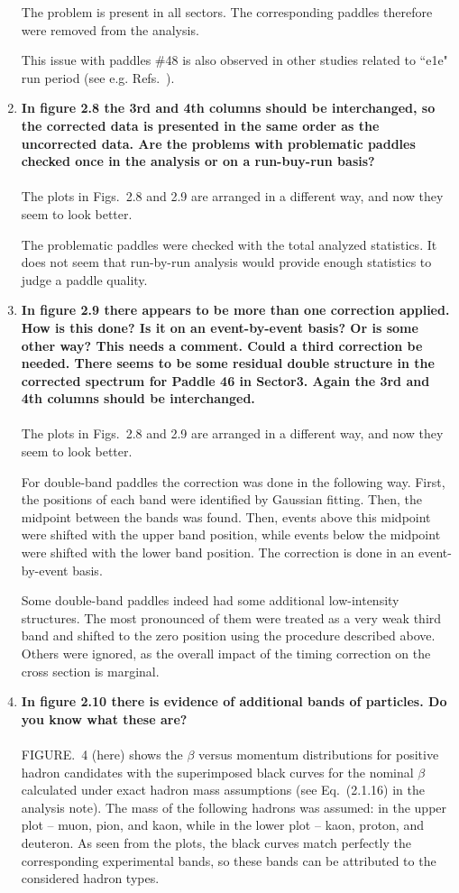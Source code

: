 \documentclass[,superscriptaddress,showpacs,amssymb,amsmath,amsfonts,linenumbers,article]{revtex4-1}
\begin{document}
\begin{enumerate}[label=\textbf{\arabic*}.]
The problem is present in all sectors. The corresponding paddles therefore were removed from the analysis.

This issue with paddles \#48 is also observed in other studies related to ``e1e" run period (see e.g. Refs.~\cite{fedotov_prc,Ye_Tian:2017}).


\item {\bf In figure 2.8 the 3rd and 4th columns should be interchanged, so the corrected data is presented in the same order as the uncorrected data. Are the problems with problematic paddles checked once in the analysis or on a run-buy-run basis?}\\ \\
The plots in Figs.~2.8 and 2.9 are arranged in a different way, and now they seem to look better. 

The problematic paddles were checked with the total analyzed statistics. It does not seem that run-by-run analysis would provide enough statistics to judge a paddle quality.

\item {\bf In figure 2.9 there appears to be more than one correction applied. How is this done? Is it on an event-by-event basis? Or is some other way? This needs a comment. Could a third correction be needed. There seems to be some residual double structure in the corrected spectrum for Paddle 46 in Sector3. Again the 3rd and 4th columns should be interchanged.}\\ \\
The plots in Figs.~2.8 and 2.9 are arranged in a different way, and now they seem to look better. 

For double-band paddles the correction was done in the following way. First, the positions of each band were identified by Gaussian fitting. Then, the midpoint between the bands was found. Then, events above this midpoint were shifted with the upper band position, while events below the midpoint were shifted with the lower band position. The correction is done in an event-by-event basis.

Some double-band paddles indeed had some additional low-intensity structures. The most pronounced of them were treated as a very weak third band and shifted to the zero position using the procedure described above. Others were ignored, as the overall impact of the timing correction on the cross section is marginal.

\item {\bf In figure 2.10 there is evidence of additional bands of particles. Do you know what these are?} \\ \\
FIGURE.~4 (here) shows the $\beta$ versus momentum distributions for positive hadron candidates with the superimposed black curves for the nominal $\beta$ calculated under exact hadron mass assumptions (see Eq.~(2.1.16) in the analysis note). The mass of the following hadrons was assumed: in the upper plot -- muon, pion, and kaon, while in the lower plot -- kaon, proton, and deuteron. As seen from the plots, the black curves match perfectly the corresponding experimental bands, so these bands can be attributed to the considered hadron types.


\end{enumerate}
\end{document}
